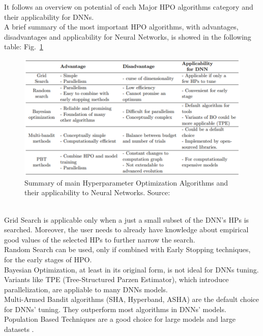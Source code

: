 It follows an overview on potential of each Major HPO algorithms category and their applicability for DNNs.
\\[0.3cm]A brief summary of the most important HPO algorithms, with advantages, disadvantages and applicability for Neural Networks, is showed in the following table: Fig.~\ref{fig:figure-2.6.1}
\begin{figure}[t]
	\centering
	\includegraphics[width=15cm]{figures/figure-2.6.1.png}
	\caption[HPO Algorithm for NNs Summary]{Summary of main Hyperparameter Optimization Algorithms and their applicability to Neural Networks. Source:~\cite{Tesi-1.9}}
	\label{fig:figure-2.6.1}
\end{figure}
% 
\\[0.3cm]Grid Search is applicable only when a just a small subset of the DNN's HPs is searched. Moreover, the user needs to already have knowledge about empirical good values of the selected HPs to further narrow the search.
\\[0.3cm]Random Search can be used, only if combined with Early Stopping techniques, for the early stages of HPO.
\\[0.3cm]Bayesian Optimization, at least in its original form, is not ideal for DNNs tuning. Variants like TPE (Tree-Structured Parzen Estimator), which introduce parallelization, are appliable to many DNNs models.
\\[0.3cm]Multi-Armed Bandit algorithms (SHA, Hyperband, ASHA) are the default choice for DNNs' tuning. They outperform most algorithms in DNNs' models.
\\[0.3cm]Population Based Techniques are a good choice for large models and large datasets \cite{Tesi-1.9}.